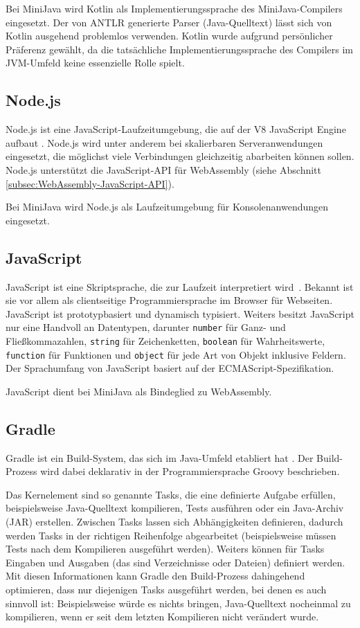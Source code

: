 Bei MiniJava wird Kotlin als Implementierungssprache des MiniJava-Compilers eingesetzt. Der von ANTLR generierte Parser (Java-Quelltext) lässt sich von Kotlin ausgehend problemlos verwenden. Kotlin wurde aufgrund persönlicher Präferenz gewählt, da die tatsächliche Implementierungssprache des Compilers im JVM-Umfeld keine essenzielle Rolle spielt.

\subsection{Node.js}
Node.js ist eine JavaScript-Laufzeitumgebung, die auf der V8 JavaScript Engine aufbaut \cite{NodeJSDocumentation}. Node.js wird unter anderem bei skalierbaren Serveranwendungen eingesetzt, die möglichst viele Verbindungen gleichzeitig abarbeiten können sollen. Node.js unterstützt die JavaScript-API für WebAssembly (siehe Abschnitt \ref{subsec:WebAssembly-JavaScript-API}).

Bei MiniJava wird Node.js als Laufzeitumgebung für Konsolenanwendungen eingesetzt.

\subsection{JavaScript}
JavaScript ist eine Skriptsprache, die zur Laufzeit interpretiert wird \cite{MDNJavaScript}. Bekannt ist sie vor allem als clientseitige Programmiersprache im Browser für Webseiten. Ja\-va\-Script ist prototypbasiert und dynamisch typisiert. Weiters besitzt JavaScript nur eine Handvoll an Datentypen, darunter \lstinline{number} für Ganz- und Fließkommazahlen, \lstinline{string} für Zeichenketten, \lstinline{boolean} für Wahrheitswerte, \lstinline{function} für Funktionen und \lstinline{object} für jede Art von Objekt inklusive Feldern. Der Sprachumfang von JavaScript basiert auf der ECMAScript-Spezifikation.

JavaScript dient bei MiniJava als Bindeglied zu WebAssembly.

\subsection{Gradle}
Gradle ist ein Build-System, das sich im Java-Umfeld etabliert hat \cite{Gradle}. Der Build-Prozess wird dabei deklarativ in der Programmiersprache Groovy beschrieben.

Das Kernelement sind so genannte Tasks, die eine definierte Aufgabe erfüllen, beispielsweise Java-Quelltext kompilieren, Tests ausführen oder ein Java-Archiv (JAR) erstellen. Zwischen Tasks lassen sich Abhängigkeiten definieren, dadurch werden Tasks in der richtigen Reihenfolge abgearbeitet (beispielsweise müssen Tests nach dem Kompilieren ausgeführt werden). Weiters können für Tasks Eingaben und Ausgaben (das sind Verzeichnisse oder Dateien) definiert werden. Mit diesen Informationen kann Gradle den Build-Prozess dahingehend optimieren, dass nur diejenigen Tasks ausgeführt werden, bei denen es auch sinnvoll ist: Beispielsweise würde es nichts bringen, Java-Quelltext nocheinmal zu kompilieren, wenn er seit dem letzten Kompilieren nicht verändert wurde.

